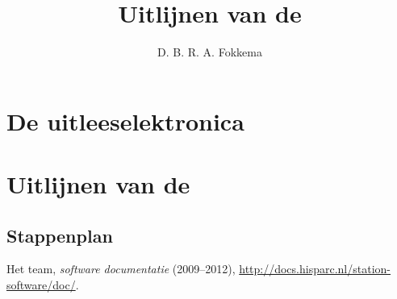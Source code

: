 



\title{Uitlijnen van de \adcs}
\author{D. B. R. A. Fokkema}
\date{}

\maketitle

\section{De \hisparc uitleeselektronica}

\section{Uitlijnen van de \adcs}

\subsection{Stappenplan}


\begin{thebibliography}{9}
 Het \hisparc team, \emph{\hisparc software
documentatie} (2009--2012),
\url{http://docs.hisparc.nl/station-software/doc/}.
\end{thebibliography}


